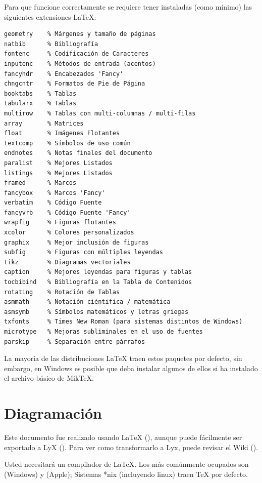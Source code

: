 Para que funcione correctamente se requiere tener instaladas (como mínimo) las siguientes extensiones \LaTeX{}:
\begin{Verbatim}[frame=lines, label=Paquetes requeridos por \inlinecode{thesis_utfsm.sty}
				, fontsize=\footnotesize
				, baselinestretch=1
				, formatcom=\color{gray}]
geometry    % Márgenes y tamaño de páginas
natbib      % Bibliografía
fontenc     % Codificación de Caracteres
inputenc    % Métodos de entrada (acentos)
fancyhdr    % Encabezados 'Fancy'
chngcntr    % Formatos de Pie de Página
booktabs    % Tablas
tabularx    % Tablas
multirow    % Tablas con multi-columnas / multi-filas
array       % Matrices
float       % Imágenes Flotantes
textcomp    % Símbolos de uso común
endnotes    % Notas finales del documento
paralist    % Mejores Listados
listings    % Mejores Listados
framed      % Marcos
fancybox    % Marcos 'Fancy'
verbatim    % Código Fuente
fancyvrb    % Código Fuente 'Fancy'
wrapfig     % Figuras flotantes
xcolor      % Colores personalizados
graphix     % Mejor inclusión de figuras
subfig      % Figuras con múltiples leyendas
tikz        % Diagramas vectoriales
caption     % Mejores leyendas para figuras y tablas
tocbibind   % Bibliografía en la Tabla de Contenidos
rotating    % Rotación de Tablas
asmmath     % Notación ciéntifica / matemática
asmsymb     % Símbolos matemáticos y letras griegas
txfonts     % Times New Roman (para sistemas distintos de Windows)
microtype   % Mejoras subliminales en el uso de fuentes
parskip     % Separación entre párrafos
\end{Verbatim}

La mayoría de las distribuciones \LaTeX{} traen estos paquetes por defecto, sin embargo, en Windows es posible que deba instalar algunos de ellos si ha instalado el archivo básico de MikTeX.



\section{Diagramación}
Este documento fue realizado usando \LaTeX{} (\citeauthor{latex:whatis}), aunque puede fácilmente ser exportado a LyX (\citeauthor{lyx}). Para ver como transformarlo a Lyx, puede revisar el Wiki (\citeauthor{wikilyx}).

Usted necesitará un compilador de \LaTeX. Los más comúnmente ocupados son \citeauthor{miktex} (Windows) y \citeauthor{mactex} (Apple); Sistemas *nix (incluyendo linux) traen \TeX{} por defecto.

